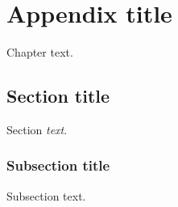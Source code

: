 

\chapter{Appendix title}


Chapter text.

\section{Section title}

Section \emph{text}. \cite{bibliographyBook}

\subsection{Subsection title}

Subsection text. \cite{bibliographyMisc}